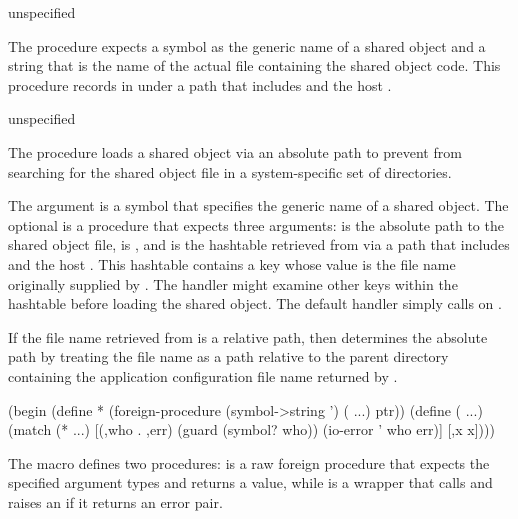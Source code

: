 \begin{procedure}
\end{procedure}
\returns{} unspecified

The  procedure expects a symbol
 as the generic name of a shared object and
a string  that is the
name of the actual file containing the shared object code.
This procedure records  in  under a
path that includes  and the host .

\begin{procedure}
\end{procedure}
\returns{} unspecified

The  procedure loads a shared object via an
absolute path to prevent  from searching for the
shared object file in a system-specific set of directories.

The  argument is a symbol that specifies the generic name of a
shared object.
The optional  is a procedure that expects three arguments:
 is the absolute path to the shared object file,
 is , and  is the hashtable
retrieved from  via a path that includes
 and the host .
This hashtable contains a key  whose value
is the file name originally supplied by .
The handler might examine other keys within the hashtable before
loading the shared object.
The default handler simply calls  on .

If the file name retrieved from  is a relative path,
then  determines the absolute path by
treating the file name as a path relative to the parent directory
containing the application configuration file name returned by .

\begin{syntax}
\end{syntax}
\expandsto{} \antipar\codebegin
(begin
  (define * (foreign-procedure (symbol->string ') ( ...) ptr))
  (define (  ...)
    (match (*  ...)
      [(,who . ,err)
       (guard (symbol? who))
       (io-error ' who err)]
      [,x x])))
\codeend

The  macro defines two procedures: 
is a raw foreign procedure that expects the specified argument types and returns
a  value, while  is a wrapper that calls 
and raises an  if it returns an error pair.


